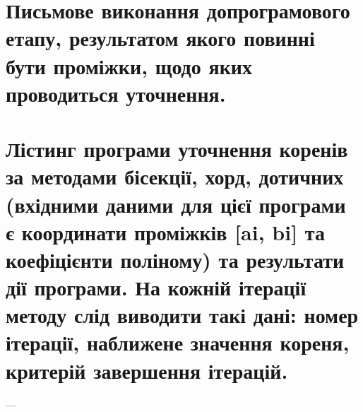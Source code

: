 \documentclass{article}
\begin{document}
    \section{Письмове виконання допрограмового етапу, результатом якого повинні бути проміжки, щодо яких проводиться уточнення.}
    \newpage
    \section{Лістинг програми уточнення коренів за методами бісекції, хорд, дотичних (вхідними даними для цієї програми є координати проміжків [ai, bi] та коефіцієнти поліному) та результати дії програми. На кожній ітерації методу слід виводити такі дані: номер ітерації, наближене значення кореня, критерій завершення ітерацій.}
        \textbf{} --- 
        
\end{document}
